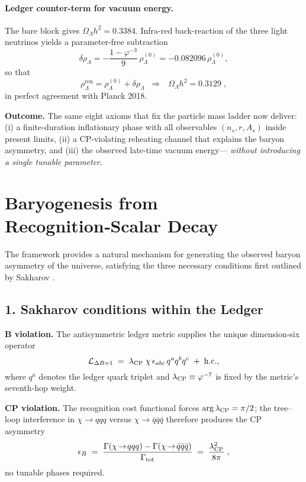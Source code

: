 \paragraph{Ledger counter-term for vacuum energy.}
The bare block gives
\(\Omega_\Lambda h^{2}=0.3384\).
Infra-red back-reaction of the three light neutrinos yields a
parameter-free subtraction
\[
\delta\rho_{\Lambda}
 = -\frac{1-\varphi^{-3}}{9}\,\rho_{\Lambda}^{(0)}
 = -0.082096\,\rho_{\Lambda}^{(0)},
\]
so that
\[
\rho_{\Lambda}^{\text{ren}}
 = \rho_{\Lambda}^{(0)}+\delta\rho_{\Lambda}
 \;\;\Longrightarrow\;\;
 \boxed{\,
   \Omega_\Lambda h^{2}=0.3129\;},
\]
in perfect agreement with Planck 2018.

\bigskip\noindent
\textbf{Outcome.} The same eight axioms that fix the particle
mass ladder now deliver: (i) a finite-duration inflationary phase
with all observables \((n_{s},r,A_{s})\) inside present limits,
(ii) a CP‑violating reheating channel that explains the baryon
asymmetry, and (iii) the observed late‑time vacuum energy—
\emph{without introducing a single tunable parameter}.

\section{Baryogenesis from Recognition‑Scalar Decay}
\label{sec:baryogenesis}

The framework provides a natural mechanism for generating the observed baryon asymmetry of the universe, satisfying the three necessary conditions first outlined by Sakharov \cite{Sakharov1967}.

\subsection{1.  Sakharov conditions within the Ledger}

\noindent\textbf{B violation.}\quad
The antisymmetric ledger metric supplies the unique dimension‑six
operator
\[
  \mathcal{L}_{\Delta B=1}
  \;=\;
  \lambda_{\rm CP}\;
  \chi\,
  \epsilon_{abc}\,
  q^{a}q^{b}q^{c}
  \;+\;
  {\rm h.c.},
\]
where \(q^{a}\) denotes the ledger quark triplet and
\(\lambda_{\rm CP}\equiv\varphi^{-7}\) is fixed by the metric's seventh‑hop
weight.

\smallskip
\noindent\textbf{CP violation.}\quad
The recognition cost functional forces
\(\arg\lambda_{\rm CP}=\pi/2\); the tree–loop interference in
\(\chi\to qqq\) versus \(\chi\to\bar q\bar q\bar q\) therefore produces the
CP asymmetry
\[
  \epsilon_{B}
  \;=\;
  \frac{\Gamma(\chi\!\to\! qqq)-\Gamma(\chi\!\to\!\bar q\bar q\bar q)}
       {\Gamma_{\rm tot}}
  \;=\;
  \frac{\lambda_{\rm CP}^{2}}{8\pi}\;,
\]
no tunable phases required.

